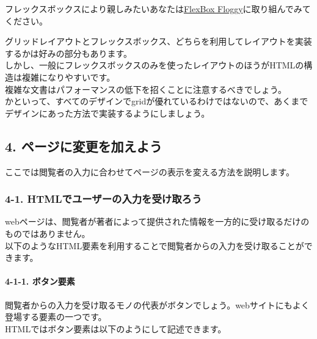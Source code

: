 フレックスボックスにより親しみたいあなたは\href{https://flexboxfroggy.com/\#ja}{FlexBox
Floggy}に取り組んでみてください。

グリッドレイアウトとフレックスボックス、どちらを利用してレイアウトを実装するかは好みの部分もあります。\\
しかし、一般にフレックスボックスのみを使ったレイアウトのほうがHTMLの構造は複雑になりやすいです。\\
複雑な文書はパフォーマンスの低下を招くことに注意するべきでしょう。\\
かといって、すべてのデザインでgridが優れているわけではないので、あくまでデザインにあった方法で実装するようにしましょう。

\subsection{4.
ページに変更を加えよう}\label{ux30daux30fcux30b8ux306bux5909ux66f4ux3092ux52a0ux3048ux3088ux3046}

ここでは閲覧者の入力に合わせてページの表示を変える方法を説明します。

\subsubsection{4-1.
HTMLでユーザーの入力を受け取ろう}\label{htmlux3067ux30e6ux30fcux30b6ux30fcux306eux5165ux529bux3092ux53d7ux3051ux53d6ux308dux3046}

webページは、閲覧者が著者によって提供された情報を一方的に受け取るだけのものではありません。\\
以下のようなHTML要素を利用することで閲覧者からの入力を受け取ることができます。

\paragraph{4-1-1. ボタン要素}\label{ux30dcux30bfux30f3ux8981ux7d20}

閲覧者からの入力を受け取るモノの代表がボタンでしょう。webサイトにもよく登場する要素の一つです。\\
HTMLではボタン要素は以下のようにして記述できます。

\begin{Shaded}
\begin{Highlighting}[]
\DataTypeTok{\textless{}}\DataTypeTok{\textgreater{}}\DataTypeTok{\textless{}/}\DataTypeTok{\textgreater{}}
\DataTypeTok{\textless{}}\DataTypeTok{\textgreater{}}\DataTypeTok{\textless{}/}\DataTypeTok{\textgreater{}}
\end{Highlighting}
\end{Shaded}

